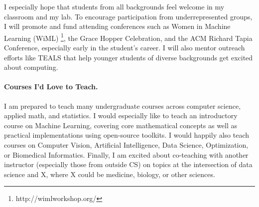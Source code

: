 \documentclass[11pt,letterpaper]{article}
\begin{document}
I especially hope that students from all backgrounds feel welcome in my classroom and my lab. To encourage participation from underrepresented groups, I will promote and fund attending conferences such as Women in Machine Learning (WiML) \footnote{http://wimlworkshop.org/}, the Grace Hopper Celebration, and the ACM Richard Tapia Conference, especially early in the student's career. I will also mentor outreach efforts like TEALS that help younger students of diverse backgrounds get excited about computing.




\paragraph{Courses I'd Love to Teach.}
I am prepared to teach many undergraduate courses across computer science, applied math, and statistics. I would especially like to teach an introductory course on Machine Learning, covering core mathematical concepts as well as practical implementations using open-source toolkits. I would happily also teach courses on Computer Vision, Artificial Intelligence, Data Science, Optimization, or Biomedical Informatics. 
Finally, I am excited about co-teaching with another instructor (especially those from outside CS) on topics at the intersection of data science and X, where X could be medicine, biology, or other sciences.
\end{document}
